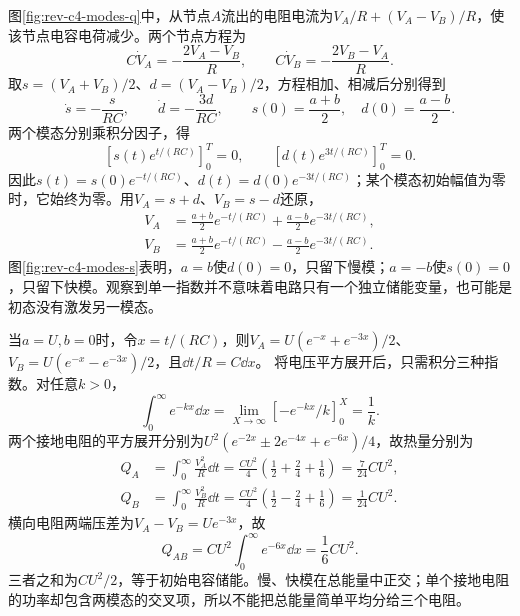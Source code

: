 \begin{solution}
图\ref{fig:rev-c4-modes-q}中，从节点$A$流出的电阻电流为$V_A/R+(V_A-V_B)/R$，使该节点电容电荷减少。两个节点方程为
\[
 C\dot V_A=-\frac{2V_A-V_B}{R},\qquad
 C\dot V_B=-\frac{2V_B-V_A}{R}.
\]
取$s=(V_A+V_B)/2$、$d=(V_A-V_B)/2$，方程相加、相减后分别得到
\[
 \dot s=-\frac{s}{RC},\qquad\dot d=-\frac{3d}{RC},\qquad
 s(0)=\frac{a+b}{2},\quad d(0)=\frac{a-b}{2}.
\]
两个模态分别乘积分因子，得
\[
 [s(t)e^{t/(RC)}]_0^T=0,\qquad[d(t)e^{3t/(RC)}]_0^T=0.
\]
因此$s(t)=s(0)e^{-t/(RC)}$、$d(t)=d(0)e^{-3t/(RC)}$；某个模态初始幅值为零时，它始终为零。用$V_A=s+d$、$V_B=s-d$还原，
\[
 \boxed{\begin{aligned}
 V_A&=\frac{a+b}{2}e^{-t/(RC)}+\frac{a-b}{2}e^{-3t/(RC)},\\
 V_B&=\frac{a+b}{2}e^{-t/(RC)}-\frac{a-b}{2}e^{-3t/(RC)}.
 \end{aligned}}
\]
图\ref{fig:rev-c4-modes-s}表明，$a=b$使$d(0)=0$，只留下慢模；$a=-b$使$s(0)=0$，只留下快模。观察到单一指数并不意味着电路只有一个独立储能变量，也可能是初态没有激发另一模态。

当$a=U,b=0$时，令$x=t/(RC)$，则$V_A=U(e^{-x}+e^{-3x})/2$、$V_B=U(e^{-x}-e^{-3x})/2$，且$\dd t/R=C\dd x$。
将电压平方展开后，只需积分三种指数。对任意$k>0$，
\[
 \int_0^\infty e^{-kx}\dd x=\lim_{X\to\infty}[-e^{-kx}/k]_0^X=\frac1k.
\]
两个接地电阻的平方展开分别为$U^2(e^{-2x}\pm2e^{-4x}+e^{-6x})/4$，故热量分别为
\begin{align*}
 Q_A&=\int_0^\infty\frac{V_A^2}{R}\dd t
 =\frac{CU^2}{4}\left(\frac12+\frac24+\frac16\right)
 =\frac7{24}CU^2,\\
 Q_B&=\int_0^\infty\frac{V_B^2}{R}\dd t
 =\frac{CU^2}{4}\left(\frac12-\frac24+\frac16\right)
 =\frac1{24}CU^2.
\end{align*}
横向电阻两端压差为$V_A-V_B=Ue^{-3x}$，故
\[
 Q_{AB}=CU^2\int_0^\infty e^{-6x}\dd x=\frac16CU^2.
\]
三者之和为$CU^2/2$，等于初始电容储能。慢、快模在总能量中正交；单个接地电阻的功率却包含两模态的交叉项，所以不能把总能量简单平均分给三个电阻。
\end{solution}
